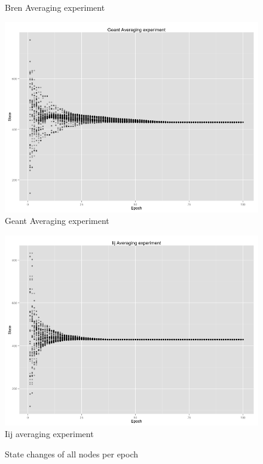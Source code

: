 \begin{figure}[h!]
\begin{minipage}[t]{0.47\textwidth}
    Bren Averaging experiment
    \end{minipage}
    \vspace{5ex}
    \begin{minipage}[t]{0.47\textwidth}
    \vspace{0pt}
    \includegraphics[width=\linewidth]{figures/Geant.png}
    Geant Averaging experiment
    \end{minipage}
    \begin{minipage}[t]{0.47\textwidth}
    \vspace{0pt}
    \includegraphics[width=\linewidth]{figures/Iij.png}
    Iij averaging experiment
    \end{minipage}
    \caption{State changes of all nodes per epoch}
    \label{fig:result}

\end{figure}
